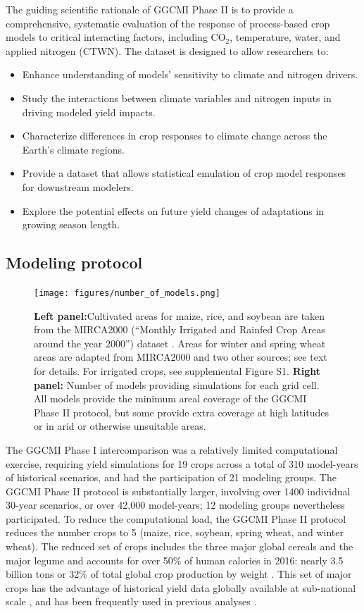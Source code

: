 \documentclass[gmd, manuscript]{copernicus} %
\begin{document}
The guiding scientific rationale of GGCMI Phase II is to provide a comprehensive, systematic evaluation of the response of process-based crop models to critical interacting factors, including CO$_2$, temperature, water, and applied nitrogen (CTWN). 
The dataset is designed to allow researchers to:
\begin{itemize}
    \item Enhance understanding of models’ sensitivity to climate and nitrogen drivers.
    \item Study the interactions between climate variables and nitrogen inputs in driving modeled yield impacts. 
    \item Characterize differences in crop responses to climate change across the Earth's climate regions.
    \item Provide a dataset that allows statistical emulation of crop model responses for downstream modelers.
    \item Explore the potential effects on future yield changes of adaptations in growing season length.
\end{itemize}
\vspace{-0.05in}

\subsection{Modeling protocol}
\begin{figure}[ht]
  \centering
  \texttt{[image: figures/number\_of\_models.png]}
  \caption{
  \textbf{Left panel:}Cultivated areas for maize, rice, and soybean are taken from the MIRCA2000 (``Monthly Irrigated and Rainfed Crop Areas around the year 2000'') dataset \citep{Portmann2010}. 
  Areas for winter and spring wheat areas are adapted from MIRCA2000 and two other sources; see text for details.  For irrigated crops, see supplemental Figure S1.
  \textbf{Right panel:} Number of models providing simulations for each grid cell.  
  All models provide the minimum areal coverage of the GGCMI Phase II protocol, but some provide extra coverage at high latitudes or in arid or otherwise unsuitable areas.}
  \label{fig:crop_area}
\end{figure}

The GGCMI Phase I intercomparison was a relatively limited computational exercise, requiring yield simulations for 19 crops across a total of 310 model-years of historical scenarios, and had the participation of 21 modeling groups.
The GGCMI Phase II protocol is substantially larger, involving over 1400 individual 30-year scenarios, or over 42,000 model-years; 12 modeling groups nevertheless participated. To reduce the computational load, the GGCMI Phase II protocol reduces the number crops to 5 (maize, rice, soybean, spring wheat, and winter wheat). 
The reduced set of crops includes the three major global cereals and the major legume and accounts for over 50\% of human calories in 2016: nearly 3.5 billion tons or 32\% of total global crop production by weight \citep{FAOSTAT}. 
This set of major crops has the advantage of historical yield data globally available at sub-national scale \citep{Ray2012,iizumi_historical_2014}, and has been frequently used in previous analyses \citep[e.g.][]{muller_global_2017,porwollik_spatial_2016}.
\end{document}
